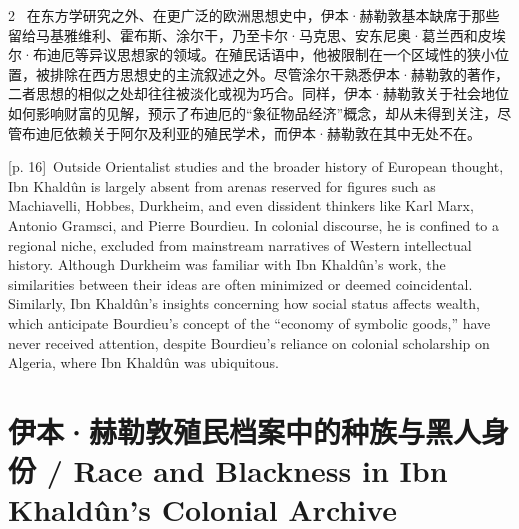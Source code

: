 \documentclass[10pt,a4paper]{article}
\begin{document}
\begin{paracol}{2}
\switchcolumn*
{\scriptsize\color{gray} [p. 16]}\ 在东方学研究之外、在更广泛的欧洲思想史中，伊本·赫勒敦基本缺席于那些留给马基雅维利、霍布斯、涂尔干，乃至卡尔·马克思、安东尼奥·葛兰西和皮埃尔·布迪厄等异议思想家的领域。在殖民话语中，他被限制在一个区域性的狭小位置，被排除在西方思想史的主流叙述之外。尽管涂尔干熟悉伊本·赫勒敦的著作，二者思想的相似之处却往往被淡化或视为巧合。同样，伊本·赫勒敦关于社会地位如何影响财富的见解，预示了布迪厄的“象征物品经济”概念，却从未得到关注，尽管布迪厄依赖关于阿尔及利亚的殖民学术，而伊本·赫勒敦在其中无处不在。\par
\switchcolumn
{\scriptsize\color{gray} [p. 16]}\ Outside Orientalist studies and the broader history of European thought, Ibn Khaldûn is largely absent from arenas reserved for figures such as Machiavelli, Hobbes, Durkheim, and even dissident thinkers like Karl Marx, Antonio Gramsci, and Pierre Bourdieu. In colonial discourse, he is confined to a regional niche, excluded from mainstream narratives of Western intellectual history. Although Durkheim was familiar with Ibn Khaldûn’s work, the similarities between their ideas are often minimized or deemed coincidental. Similarly, Ibn Khaldûn’s insights concerning how social status affects wealth, which anticipate Bourdieu’s concept of the “economy of symbolic goods,” have never received attention, despite Bourdieu’s reliance on colonial scholarship on Algeria, where Ibn Khaldûn was ubiquitous.\par
\switchcolumn*
\end{paracol}
\section*{伊本·赫勒敦殖民档案中的种族与黑人身份 / Race and Blackness in Ibn Khaldûn’s Colonial Archive}
\end{document}
